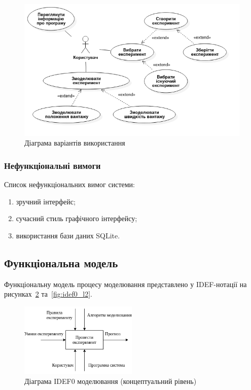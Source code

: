 \begin{figure}[H]
  \centering
    \includegraphics[width=1\textwidth]{uml_usecase}
  \caption{Діаграма варіантів використання}
  \label{fig:usecase}
\end{figure}

\subsubsection{Нефункціональні вимоги}
Список нефункціональних вимог системи:
\begin{enumerate}[label={\arabic*)}]
	\item зручний інтерфейс;
	\item сучасний стиль графічного інтерфейсу;
	\item використання бази даних SQLite.
\end{enumerate}

\subsection{Функціональна модель}
Функціональну модель процесу моделювання представлено у IDEF-нотації на рисунках~\ref{fig:idef0_l1} та~\ref{fig:idef0_l2}.

\begin{figure}[H]
  \centering
    \includegraphics[width=0.5\textwidth]{idef0_l1}
  \caption{Діаграма IDEF0 моделювання (концептуальний рівень)}
  \label{fig:idef0_l1}
\end{figure}

